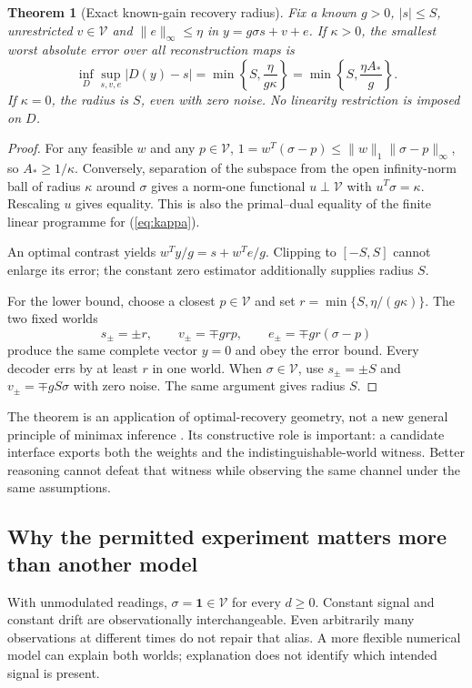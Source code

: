 \documentclass[11pt,letterpaper]{article}
\newcommand{\calV}{\mathcal V}\newcommand{\calP}{\mathcal P}
\newcommand{\norm}[1]{\lVert#1\rVert}
\newtheorem{theorem}{Theorem}[section]
\theoremstyle{definition}\newtheorem{definition}[theorem]{Definition}
\theoremstyle{remark}\newtheorem{remark}[theorem]{Remark}
\begin{document}
\begin{theorem}[Exact known-gain recovery radius]
\label{thm:known}
Fix a known $g>0$, $|s|\le S$, unrestricted $v\in\calV$ and $\norm{e}_\infty\le\eta$ in $y=g\sigma s+v+e$. If $\kappa>0$, the smallest worst absolute error over \emph{all} reconstruction maps is
\begin{equation}
 \inf_D\sup_{s,v,e}|D(y)-s|=
 \min\left\{S,\frac{\eta}{g\kappa}\right\}
 =\min\left\{S,\frac{\eta A_*}{g}\right\}.
 \label{eq:knownradius}
\end{equation}
If $\kappa=0$, the radius is $S$, even with zero noise. No linearity restriction is imposed on $D$.
\end{theorem}
\begin{proof}
For any feasible $w$ and any $p\in\calV$, $1=w^T(\sigma-p)\le\norm{w}_1\norm{\sigma-p}_\infty$, so $A_*\ge1/\kappa$. Conversely, separation of the subspace from the open infinity-norm ball of radius $\kappa$ around $\sigma$ gives a norm-one functional $u\perp\calV$ with $u^T\sigma=\kappa$. Rescaling $u$ gives equality. This is also the primal--dual equality of the finite linear programme for (\ref{eq:kappa}).

An optimal contrast yields $w^Ty/g=s+w^Te/g$. Clipping to $[-S,S]$ cannot enlarge its error; the constant zero estimator additionally supplies radius $S$.

For the lower bound, choose a closest $p\in\calV$ and set $r=\min\{S,\eta/(g\kappa)\}$. The two fixed worlds
\begin{equation}
 s_\pm=\pm r,\qquad v_\pm=\mp gr p,\qquad
 e_\pm=\mp gr(\sigma-p)
 \label{eq:knownwitness}
\end{equation}
produce the same complete vector $y=0$ and obey the error bound. Every decoder errs by at least $r$ in one world. When $\sigma\in\calV$, use $s_\pm=\pm S$ and $v_\pm=\mp gS\sigma$ with zero noise. The same argument gives radius $S$.
\end{proof}

The theorem is an application of optimal-recovery geometry, not a new general principle of minimax inference \cite{ettehad}. Its constructive role is important: a candidate interface exports both the weights and the indistinguishable-world witness. Better reasoning cannot defeat that witness while observing the same channel under the same assumptions.

\subsection{Why the permitted experiment matters more than another model}
With unmodulated readings, $\sigma=\mathbf1\in\calV$ for every $d\ge0$. Constant signal and constant drift are observationally interchangeable. Even arbitrarily many observations at different times do not repair that alias. A more flexible numerical model can explain both worlds; explanation does not identify which intended signal is present.
\end{document}
